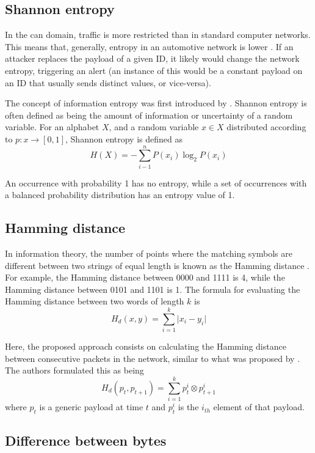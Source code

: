 \subsection{Shannon entropy}

In the \gls{can} domain, traffic is more restricted than in standard computer networks. This means that, generally, entropy in an automotive network is lower \citep{muter2011entropy}. If an attacker replaces the payload of a given ID, it likely would change the network entropy, triggering an alert (an instance of this would be a constant payload on an ID that usually sends distinct values, or vice-versa).\par
The concept of information entropy was first introduced by \cite{shannon1948}. Shannon entropy is often defined as being the amount of information or uncertainty of a random variable. For an alphabet $X$, and a random variable $x \in X$ distributed according to $p: x \rightarrow [0, 1]$, Shannon entropy is defined as \[H(X) = - \sum_{i - 1}^{n} P(x_i) \log_2 P(x_i)\]\par
An occurrence with probability 1 has no entropy, while a set of occurrences with a balanced probability distribution has an entropy value of 1. 

\subsection{Hamming distance}

In information theory, the number of points where the matching symbols are different between two strings of equal length is known as the Hamming distance \citep{hamming1950}. For example, the Hamming distance between 0000 and 1111 is 4, while the Hamming distance between 0101 and 1101 is 1. The formula for evaluating the Hamming distance between two words of length $k$ is \[H_d(x, y) = \sum_{i = 1}^{k} \vert x_i - y_i \vert\]\par

Here, the proposed approach consists on calculating the Hamming distance between consecutive packets in the network, similar to what was proposed by \cite{stabili2017}. The authors formulated this as being \[H_d(p_t, p_{t + 1}) = \sum_{i = 1}^{k} p_{t}^{i} \otimes p_{t + 1}^{i}\] where $p_t$ is a generic payload at time $t$ and $p_t^i$ is the $i_{th}$ element of that payload.

\subsection{Difference between bytes}

